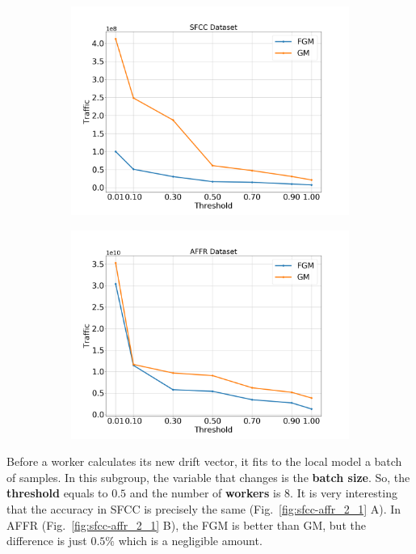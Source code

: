 \begin{figure}[H]
\begin{subfigure}[b]{0.45\textwidth}
        \includegraphics[width=\textwidth]{./images/results/sfc-plots/exp_Fig_1_3.png}
        \caption{}
    \end{subfigure}
    \hfill
    \begin{subfigure}[b]{0.45\textwidth}
        \centering
        \includegraphics[width=\textwidth]{./images/results/amazon-plots/exp_Fig_1_3.png}
        \caption{}
    \end{subfigure}
    \caption{}
    \label{fig:sfcc-affr_1}
\end{figure}

\newpage

Before a worker calculates its new drift vector, it fits to the local model a batch of samples.
In this subgroup, the variable that changes is the \textbf{batch size}.
So, the \textbf{threshold} equals to $0.5$ and the number of \textbf{workers} is $8$.
It is very interesting that the accuracy in SFCC is precisely the same (Fig.~\ref{fig:sfcc-affr_2_1} A).
In AFFR (Fig.~\ref{fig:sfcc-affr_2_1} B), the FGM is better than GM, but the difference is just $0.5\%$ which is a negligible amount.

